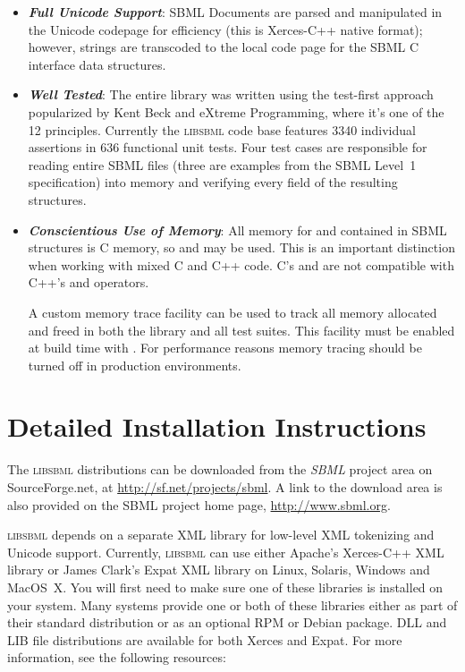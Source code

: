 \documentclass{sbmlmanual}
\newcommand{\libsbml}{\textsc{libsbml}}
\begin{document}
\begin{itemize}
\item \textbf{\textsl{Full Unicode Support}}: SBML Documents are parsed and
  manipulated in the Unicode codepage for efficiency (this is Xerces-C++
  native format); however, strings are transcoded to the local code page
  for the SBML C interface data structures.
  
\item \textbf{\textsl{Well Tested}}: The entire library was written using
  the test-first approach popularized by Kent Beck and eXtreme Programming,
  where it's one of the 12 principles.  Currently the \libsbml{} code base
  features 3340 individual assertions in 636 functional unit tests.  Four
  test cases are responsible for reading entire SBML files (three are
  examples from the SBML Level~1 specification) into memory and verifying
  every field of the resulting structures.
  
\item \textbf{\textsl{Conscientious Use of Memory}}: All memory for and contained in
  SBML structures is C memory, so  and 
  may be used.  This is an important distinction when working with mixed C
  and C++ code.  C's  and  are not
  compatible with C++'s  and  operators.

  A custom memory trace facility can be used to track all memory
  allocated and freed in both the library and all test suites.  This
  facility must be enabled at build time with .  For performance reasons memory tracing
  should be turned off in production environments.

\end{itemize}


\section{Detailed Installation Instructions}
\label{sec:installation}

The \libsbml{} distributions can be downloaded from the \emph{SBML} project
area on SourceForge.net, at \url{http://sf.net/projects/sbml}.  A link to
the download area is also provided on the SBML project home page,
\url{http://www.sbml.org}.

\libsbml{} depends on a separate XML library for low-level XML tokenizing
and Unicode support.  Currently, \libsbml{} can use either Apache's
Xerces-C++ XML library or James Clark's Expat XML library on Linux,
Solaris, Windows and MacOS~X.  You will first need to make sure one of
these libraries is installed on your system.  Many systems provide one or
both of these libraries either as part of their standard distribution or as
an optional RPM or Debian package.  DLL and LIB file distributions are
available for both Xerces and Expat.  For more information, see the
following resources:
\end{document}
